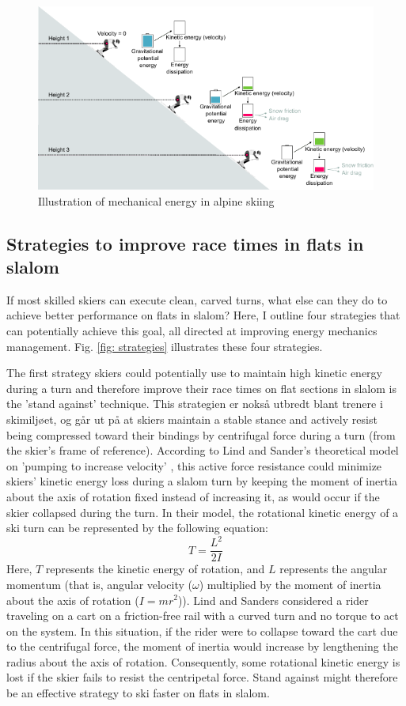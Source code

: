 \begin{figure}[H]
    \centering
    \includegraphics[width=1\linewidth]{figure/figure_introduction_mechenergy3.pdf}
    \caption{Illustration of mechanical energy in alpine skiing}
    \label{fig: energy}
\end{figure}



\subsection{Strategies to improve race times in flats in slalom}\label{introduction: strategies}
If most skilled skiers can execute clean, carved turns, what else can they do to achieve better performance on flats in slalom? Here, I outline four strategies that can potentially achieve this goal, all directed at improving energy mechanics management.  Fig. \ref{fig: strategies} illustrates these four strategies.  

The first strategy skiers could potentially use to maintain high kinetic energy during a turn and therefore improve their race times on flat sections in slalom is the 'stand against' technique. This strategien er nokså utbredt blant trenere i skimiljøet, og går ut på at skiers maintain a stable stance and actively resist being compressed toward their bindings by centrifugal force during a turn (from the skier's frame of reference). According to Lind and Sander's theoretical model on 'pumping to increase velocity' \cite{lind_physics_2013}, this active force resistance could minimize skiers' kinetic energy loss during a slalom turn by keeping the moment of inertia about the axis of rotation fixed instead of increasing it, as would occur if the skier collapsed during the turn. In their model, the rotational kinetic energy of a ski turn can be represented by the following equation: 
\[ T = \frac{L^2}{2I} \]
Here, $T$ represents the kinetic energy of rotation, and $L$ represents the angular momentum (that is, angular velocity ($\omega$) multiplied by the moment of inertia about the axis of rotation ($I = mr^2$)). Lind and Sanders considered a rider traveling on a cart on a friction-free rail with a curved turn and no torque to act on the system. In this situation, if the rider were to collapse toward the cart due to the centrifugal force, the moment of inertia would increase by lengthening the radius about the axis of rotation. Consequently, some rotational kinetic energy is lost if the skier fails to resist the centripetal force. Stand against might therefore be an effective strategy to ski faster on flats in slalom.  


